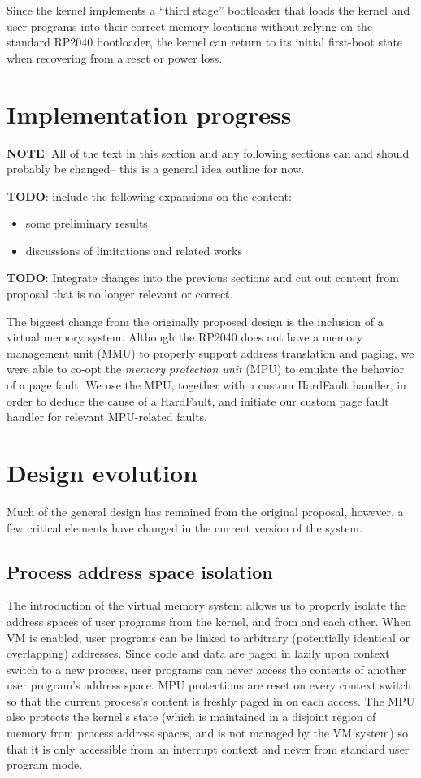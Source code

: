 \documentclass[12pt]{article}
\begin{document}
Since the kernel implements a ``third stage'' bootloader that loads the kernel
and user programs into their correct memory locations without relying on the
standard RP2040 bootloader, the kernel can return to its initial first-boot
state when recovering from a reset or power loss.

\section{Implementation progress}
\textbf{NOTE}: All of the text in this section and any following sections can
and should probably be changed-- this is a general idea outline for now.

\textbf{TODO}: include the following expansions on the content:

\begin{itemize}
    \item some preliminary results 
    \item discussions of limitations and related works
\end{itemize}

\textbf{TODO}: Integrate changes into the previous sections and cut out content
from proposal that is no longer relevant or correct.
\vspace{1em}

The biggest change from the originally proposed design is the inclusion of a
virtual memory system. Although the RP2040 does not have a memory management
unit (MMU) to properly support address translation and paging, we were able
to co-opt the \emph{memory protection unit} (MPU) to emulate the behavior of a
page fault. We use the MPU, together with a custom HardFault handler, in order
to deduce the cause of a HardFault, and initiate our custom page fault handler
for relevant MPU-related faults.


\section{Design evolution}
Much of the general design has remained from the original proposal, however, a
few critical elements have changed in the current version of the system.

\subsection{Process address space isolation}
The introduction of the virtual memory system allows us to properly isolate
the address spaces of user programs from the kernel, and from and each other.
When VM is enabled, user programs can be linked to arbitrary (potentially
identical or overlapping) addresses. Since code and data are paged in lazily
upon context switch to a new process, user programs can never access the
contents of another user program's address space. MPU protections are reset on
every context switch so that the current process's content is freshly paged in
on each access. The MPU also protects the kernel's state (which is maintained in
a disjoint region of memory from process address spaces, and is not managed by
the VM system) so that it is only accessible from an interrupt context and never
from standard user program mode.
\end{document}
